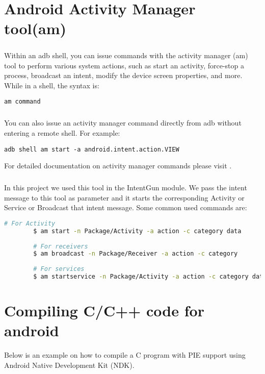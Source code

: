 \documentclass[../main.tex]{subfile}
\begin{document}
	\begin{appendices}
		\chapter{Android Activity Manager tool(am)} \label{app::android_am}
		\paragraph{} Within an adb shell, you can issue commands with the activity manager (am) tool \cite{am} to perform various system actions, such as start an activity, force-stop a process, broadcast an intent, modify the device screen properties, and more. While in a shell, the syntax is:
		\begin{lstlisting}[numbers=none]
			am command
		\end{lstlisting}
		\paragraph{} You can also issue an activity manager command directly from adb without entering a remote shell. For example:
		\begin{lstlisting}[numbers=none]
			adb shell am start -a android.intent.action.VIEW
		\end{lstlisting}
		For detailed documentation on activity manager commands please visit \cite{am}.
		\paragraph{} In this project we used this tool in the IntentGun module. We pass the intent message to this tool as parameter and it starts the corresponding Activity or Service or Broadcast that intent message. Some common used commands are:

		\begin{lstlisting}[language=bash, numbers=none]
		# For Activity
		$ am start -n Package/Activity -a action -c category data
		
		# For receivers
		$ am broadcast -n Package/Receiver -a action -c category
		
		# For services
		$ am startservice -n Package/Activity -a action -c category data
		\end{lstlisting}
		
		
		\chapter{Compiling C/C++ code for android} \label{app:ndk_c++}
		Below is an example on how to compile a C program with PIE support using Android Native Development Kit (NDK).

\end{appendices}
\end{document}
